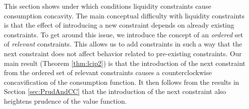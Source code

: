   This section shows under which conditions liquidity constraints cause consumption concavity. The main conceptual difficulty with liquidity constraints is that the effect of introducing a new constraint depends on already existing constraints. To get around this issue, we introduce the concept of an \textit{ordered} set of \textit{relevant} constraints. This allows us to add constraints in such a way that the next constraint does not affect behavior related to pre-existing constraints. Our main result (Theorem \ref{thm:lcip2}) is that the introduction of the next constraint from the ordered set of relevant constraints causes a counterclockwise concavification of the consumption function. It then follows from the results in Section \ref{sec:PrudAndCC} that the introduction of the next constraint also heightens prudence of the value function.

